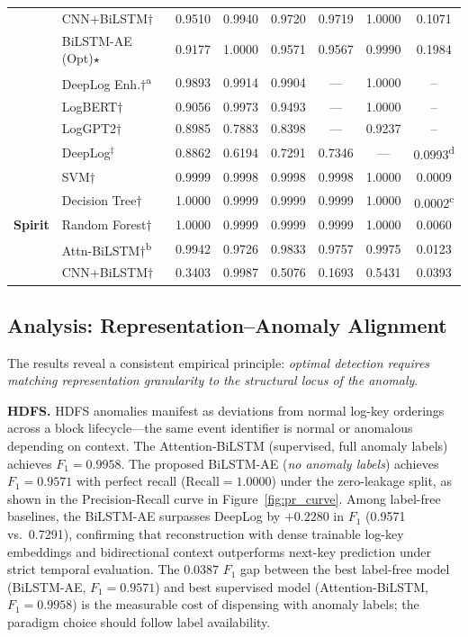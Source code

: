 \documentclass{elektr}
\begin{document}
\begin{table}[h!]
\begin{center}
{\begin{tabular}{|l|l|c|c|c|c|c|c|}
 & CNN+BiLSTM$\dagger$     & 0.9510 & 0.9940 & 0.9720 & 0.9719 & 1.0000 & 0.1071 \\
 & BiLSTM-AE (Opt)$\star$   & 0.9177 & 1.0000 & 0.9571 & 0.9567 & 0.9990 & 0.1984 \\
 & DeepLog Enh.$\dagger$\textsuperscript{a}  & 0.9893 & 0.9914 & 0.9904 & ---    & 1.0000 & --     \\
 & LogBERT$\dagger$        & 0.9056 & 0.9973 & 0.9493 & ---    & 1.0000 & --     \\
 & LogGPT2$\dagger$        & 0.8985 & 0.7883 & 0.8398 & ---    & 0.9237 & --     \\
 & DeepLog$^{\ddagger}$    & 0.8862 & 0.6194 & 0.7291 & 0.7346 & ---    & 0.0993\textsuperscript{d} \\
\hline
\multirow{5}{*}{\textbf{Spirit}}
 & SVM$\dagger$           & 0.9999 & 0.9998 & 0.9998 & 0.9998 & 1.0000 & 0.0009 \\
 & Decision Tree$\dagger$ & 1.0000 & 0.9999 & 0.9999 & 0.9999 & 1.0000 & 0.0002\textsuperscript{c} \\
 & Random Forest$\dagger$ & 1.0000 & 0.9999 & 0.9999 & 0.9999 & 1.0000 & 0.0060 \\
 & Attn-BiLSTM$\dagger$\textsuperscript{b}   & 0.9942 & 0.9726 & 0.9833 & 0.9757 & 0.9975 & 0.0123 \\
 & CNN+BiLSTM$\dagger$     & 0.3403 & 0.9987 & 0.5076 & 0.1693 & 0.5431 & 0.0393 \\
\hline
\end{tabular}%
}
\label{tab:results}
\end{center}\vs{-4mm}
\end{table}

\subsection{Analysis: Representation--Anomaly Alignment}

The results reveal a consistent empirical principle: \emph{optimal detection
requires matching representation granularity to the structural locus of the
anomaly}.

\textbf{HDFS.} HDFS anomalies manifest as deviations from normal log-key orderings
across a block lifecycle---the same event identifier is normal or anomalous
depending on context. The Attention-BiLSTM (supervised, full anomaly labels)
achieves $F_1{=}0.9958$. The proposed BiLSTM-AE (\emph{no anomaly labels})
achieves $F_1{=}0.9571$ with perfect recall ($\text{Recall}{=}1.0000$) under the
zero-leakage split, as shown in the Precision-Recall curve in Figure~\ref{fig:pr_curve}. Among label-free baselines, the BiLSTM-AE surpasses DeepLog
by $+0.2280$ in $F_1$ (0.9571 vs.~0.7291), confirming that reconstruction with
dense trainable log-key embeddings and bidirectional context outperforms next-key prediction
under strict temporal evaluation. The $0.0387$ $F_1$ gap between the best
label-free model (BiLSTM-AE, $F_1{=}0.9571$) and best supervised model
(Attention-BiLSTM, $F_1{=}0.9958$) is the measurable cost of dispensing with
anomaly labels; the paradigm choice should follow label availability.
\end{document}
